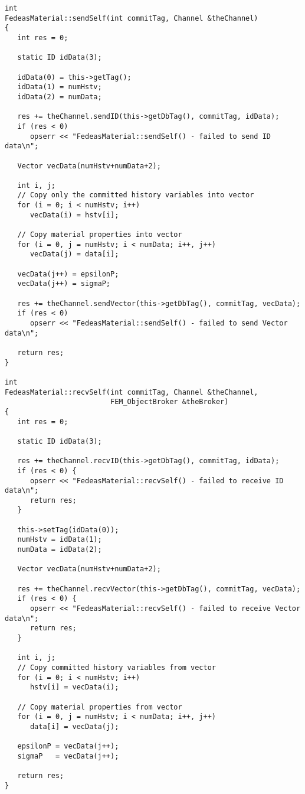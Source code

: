 \documentclass[12pt]{article}
\begin{document}
{\sf\small
\begin{verbatim}
int 
FedeasMaterial::sendSelf(int commitTag, Channel &theChannel)
{
   int res = 0;
     
   static ID idData(3);
     
   idData(0) = this->getTag();
   idData(1) = numHstv;
   idData(2) = numData;
     
   res += theChannel.sendID(this->getDbTag(), commitTag, idData);
   if (res < 0) 
      opserr << "FedeasMaterial::sendSelf() - failed to send ID data\n";
     
   Vector vecData(numHstv+numData+2);
     
   int i, j;
   // Copy only the committed history variables into vector
   for (i = 0; i < numHstv; i++)
      vecData(i) = hstv[i];
     
   // Copy material properties into vector
   for (i = 0, j = numHstv; i < numData; i++, j++)
      vecData(j) = data[i];
     
   vecData(j++) = epsilonP;
   vecData(j++) = sigmaP;
     
   res += theChannel.sendVector(this->getDbTag(), commitTag, vecData);
   if (res < 0) 
      opserr << "FedeasMaterial::sendSelf() - failed to send Vector data\n";
     
   return res;
}

int
FedeasMaterial::recvSelf(int commitTag, Channel &theChannel,
                         FEM_ObjectBroker &theBroker)
{
   int res = 0;
     
   static ID idData(3);
     
   res += theChannel.recvID(this->getDbTag(), commitTag, idData);
   if (res < 0) {
      opserr << "FedeasMaterial::recvSelf() - failed to receive ID data\n";
      return res;
   }
     
   this->setTag(idData(0));
   numHstv = idData(1);
   numData = idData(2);
     
   Vector vecData(numHstv+numData+2);
     
   res += theChannel.recvVector(this->getDbTag(), commitTag, vecData);
   if (res < 0) {
      opserr << "FedeasMaterial::recvSelf() - failed to receive Vector data\n";
      return res;
   }
     
   int i, j;
   // Copy committed history variables from vector
   for (i = 0; i < numHstv; i++)
      hstv[i] = vecData(i);
     
   // Copy material properties from vector
   for (i = 0, j = numHstv; i < numData; i++, j++)
      data[i] = vecData(j);
     
   epsilonP = vecData(j++);
   sigmaP   = vecData(j++);
     
   return res;
}
\end{verbatim}
}
\end{document}
